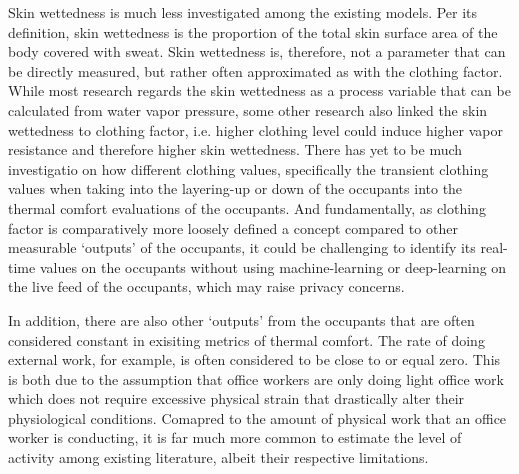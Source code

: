 	Skin wettedness is much less investigated among the existing models. Per its definition, skin wettedness is the proportion of the total skin surface area of the body covered with sweat. Skin wettedness is, therefore, not a parameter that can be directly measured, but rather often approximated as with the clothing factor\cite{mcintyre_subjective_1972}. While most research regards the skin wettedness as a process variable that can be calculated from water vapor pressure\cite{doherty_evaluation_1988}, some other research also linked the skin wettedness to clothing factor, i.e. higher clothing level could induce higher vapor resistance and therefore higher skin wettedness\cite{havenith_personal_2002}. There has yet to be much investigatio on how different clothing values, specifically the transient clothing values when taking into the layering-up or down of the occupants into the thermal comfort evaluations of the occupants. And fundamentally, as clothing factor is comparatively more loosely defined a concept compared to other measurable `outputs' of the occupants, it could be challenging to identify its real-time values on the occupants without using machine-learning or deep-learning on the live feed of the occupants, which may raise privacy concerns. 

	In addition, there are also other `outputs' from the occupants that are often considered constant in exisiting metrics of thermal comfort. The rate of doing external work, for example, is often considered to be close to or equal zero\cite{fanger_thermal_1972}. This is both due to the assumption that office workers are only doing light office work which does not require excessive physical strain that drastically alter their physiological conditions. Comapred to the amount of physical work that an office worker is conducting, it is far much more common to estimate the level of activity among existing literature, albeit their respective limitations. 

